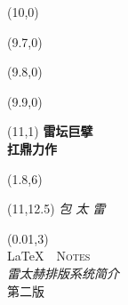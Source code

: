\begin{titlepage}

\setlength\parindent{0pt}


\begin{textblock}{6}(10,0)
    \rule{0mm}{420mm}
\end{textblock}

\begin{textblock}{.02}(9.7,0)
    \rule{0mm}{420mm}
\end{textblock}

\begin{textblock}{.02}(9.8,0)
    \rule{0mm}{420mm}
\end{textblock}

\begin{textblock}{.02}(9.9,0)
    \rule{0mm}{420mm}
\end{textblock}

\begin{textblock}{3}(11,1)
    {\Huge \textbf{雷坛巨擘}\\[5pt] \textbf{扛鼎力作}}
\end{textblock}

\begin{textblock}{12}(1.8,6)
\textblockcolour{}
\end{textblock}

\begin{textblock}{4}(11,12.5)
    {\huge \textit{包 太 雷}}\\[5pt]
    {\Large \lnotesdate}
\end{textblock}

\TPshowboxestrue
\setlength\TPboxrulesize{0.8pt}

\begin{textblock}{14}(0.01,3)
    \centering
    ~\\[20pt]
    {\fontsize{32}{40}\selectfont \LaTeX\ \ \textsc{Notes}}\\[8pt]
    {\huge \textit{雷太赫排版系统简介}}\\[8pt]
    第二版\ \ \lnotesversion\\[20pt]
\end{textblock}
~
\end{titlepage}

\newpage
\thispagestyle{empty}
~

